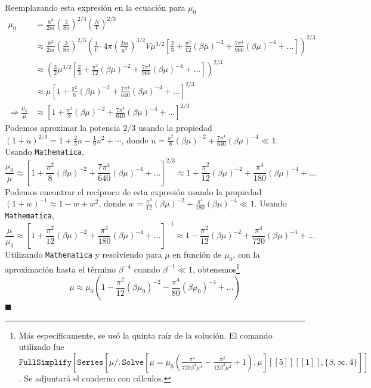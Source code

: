 \documentclass[]{article}
\numberwithin{equation}{section}
\newcommand{\0}{\textcolor{gray}{0}}
\newcommand{\qed}{\hfill\(\blacksquare\)}
\begin{document}
Reemplazando esta expresión en la ecuación para $\mu_0$
\begin{align}
	\mu_0 &= \frac{h^2}{2 m}\left(\frac{3}{8 \pi}\right)^{2 / 3}\left(\frac{N}{V}\right)^{2 / 3}\nonumber\\
	&\approx\frac{h^2}{2 m}\left(\frac{3}{8 \pi}\right)^{2 / 3}\left(\frac{1}{V} \cdot 4 \pi\left(\frac{2 m}{h^2}\right)^{3 / 2} V \mu^{3/2} \left[\frac{2}{3} + \frac{\pi^2}{12} (\beta \mu)^{-2} + \frac{7 \pi^4}{960} (\beta \mu)^{-4} + \ldots \right]\right)^{2 / 3}\nonumber\\
	&\approx \left(\frac{3}{2} \mu^{3/2} \left[\frac{2}{3} + \frac{\pi^2}{12} (\beta \mu)^{-2} + \frac{7 \pi^4}{960} (\beta \mu)^{-4} + \ldots \right]\right)^{2 / 3}\nonumber\\
	&\approx \mu \left[1 + \frac{\pi^2}{8} (\beta \mu)^{-2} + \frac{7 \pi^4}{640} (\beta \mu)^{-4} + \ldots \right]^{2 / 3}\nonumber\\
	\Rightarrow \frac{\mu_0}{\mu} &\approx \left[1 + \frac{\pi^2}{8} (\beta \mu)^{-2} + \frac{7 \pi^4}{640} (\beta \mu)^{-4} + \ldots \right]^{2 / 3}
\end{align}
Podemos aproximar la potencia $2/3$ usando la propiedad $(1+u)^{2/3} = 1 + \frac{2}{3}u - \frac{1}{9}u^2 + \cdots$, donde $u = \frac{\pi^2}{8}(\beta\mu)^{-2} + \frac{7\pi^4}{640}(\beta\mu)^{-4} \ll 1$. Usando \texttt{Mathematica},
\begin{equation}
	\frac{\mu_0}{\mu} \approx \left[1 + \frac{\pi^2}{8} (\beta \mu)^{-2} + \frac{7 \pi^4}{640} (\beta \mu)^{-4} + \ldots \right]^{2 / 3} \approx 1 + \frac{\pi ^2}{12} (\beta \mu)^{-2} + \frac{\pi ^4}{180} (\beta \mu)^{-4} + \ldots
\end{equation}
Podemos encontrar el recíproco de esta expresión usando la propiedad $(1+w)^{-1} \approx 1 - w + w^2$, donde $w = \frac{\pi^2}{12}(\beta\mu)^{-2} + \frac{\pi^4}{180}(\beta\mu)^{-4} \ll 1$. Usando \texttt{Mathematica},
\begin{equation}
	\frac{\mu}{\mu_0} \approx \left[1 + \frac{\pi ^2}{12} (\beta \mu)^{-2} + \frac{\pi ^4}{180} (\beta \mu)^{-4} + \ldots \right]^{-1} \approx 1 - \frac{\pi ^2}{12} (\beta \mu)^{-2} + \frac{\pi ^4}{720} (\beta \mu)^{-4} + \ldots
\end{equation}
Utilizando \texttt{Mathematica} y resolviendo para $\mu$ en función de $\mu_0$, con la aproximación hasta el término $\beta^{-4}$ cuando $\beta^{-1} \ll 1$, obtenemos\footnote{Más específicamente, se usó la quinta raíz de la solución. El comando utilizado fue $\texttt{FullSimplify}\left[\texttt{Series}\left[\mu \text{/.}\, \texttt{Solve}\left[\mu = \mu_0 \left(\frac{\pi ^4}{720 \beta ^4 \mu ^4}-\frac{\pi ^2}{12 \beta ^2 \mu ^2}+1\right),\mu \right][[5]][[1]],\{\beta ,\infty ,4\}\right]\right]$. Se adjuntará el cuaderno con cálculos.}
\begin{equation}
	\mu \approx \mu_0 \left(1 - \frac{\pi ^2}{12} (\beta \mu_0)^{-2} - \frac{\pi ^4}{80} (\beta \mu_0)^{-4} + \ldots\right)
\end{equation}
\qed
\end{document}
